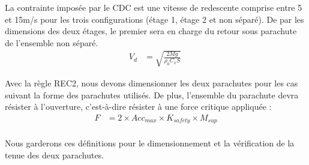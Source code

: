 La contrainte imposée par le \acrshort{CDC} est une vitesse de redescente comprise entre 5 et 15m/s pour les trois
configurations (étage 1, étage 2 et non séparé). De par les dimensions des deux étages, le premier sera en charge du retour
sous parachute de l'ensemble non séparé.
\begin{equation}
\begin{aligned}
    V_d &= \sqrt{\frac{2 M g}{\rho_0 C_x S}} \
\end{aligned}
\end{equation}

Avec la règle REC2, nous devons dimensionner les deux parachutes pour les cas suivant la forme des parachutes utilisés. De plus, l'ensemble du
parachute devra résister à l'ouverture, c'est-à-dire résister à une force critique appliquée :
\begin{equation}
\begin{aligned}
    F &= 2 \times Acc_{max} \times K_{safety} \times M_{sup} \\
\end{aligned}
\end{equation}

Nous garderons ces définitions pour le dimensionnement et la vérification de la tenue des deux parachutes.
\newpage
